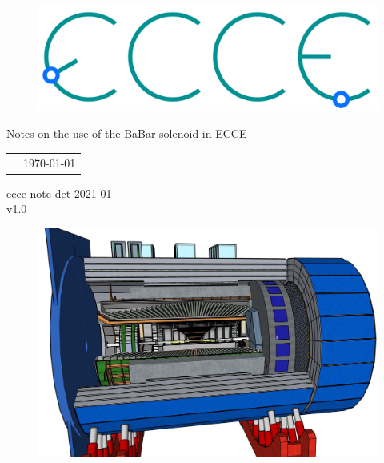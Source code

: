 \renewcommand*\familydefault{\sfdefault}
{\sffamily
\vfill
\vspace{4cm}
\begin{figure}[H]
  \begin{center}
  \includegraphics[width=0.3\linewidth]{figs/ecce-logo.png}
\end{center}
\end{figure}

\begin{center}
  \large
  {\LARGE{Notes on the use of the BaBar solenoid in ECCE}}

  \begin{tabular}{cc}

& \today%
  \end{tabular}
  \end{center}

\vspace{15cm}
\hspace*{0pt}\hfill ecce-note-det-2021-01 \\
\hspace*{0pt}\hfill v1.0
\vspace{-15cm}

\vspace{1cm}

\begin{figure}[H]
  \begin{center}
    \includegraphics[width=0.9\linewidth]{figs/ECCE.jpg}
  \end{center}
\end{figure}
}


\vfill
\renewcommand*\familydefault{\rmdefault}